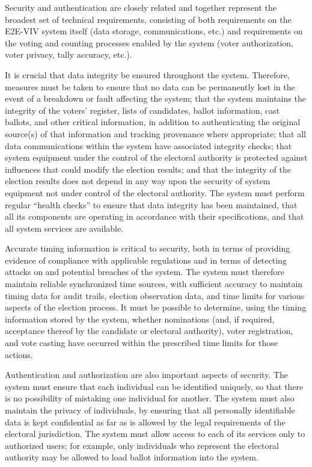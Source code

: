 Security and authentication are closely related and together represent
the broadest set of technical requirements, consisting of both
requirements on the E2E-VIV system itself (data storage,
communications, etc.) and requirements on the voting and counting
processes enabled by the system (voter authorization, voter privacy,
tally accuracy, etc.).

It is crucial that data integrity be ensured throughout the
system. Therefore, measures must be taken to ensure that no data can
be permanently lost in the event of a breakdown or fault affecting the
system; that the system maintains the integrity of the voters'
register, lists of candidates, ballot information, cast ballots, and
other critical information, in addition to authenticating the original
source(s) of that information and tracking provenance where
appropriate; that all data communications within the system have
associated integrity checks; that system equipment under the control
of the electoral authority is protected against influences that could
modify the election results; and that the integrity of the election
results does not depend in any way upon the security of system
equipment not under control of the electoral authority. The system
must perform regular ``health checks'' to ensure that data integrity
has been maintained, that all its components are operating in
accordance with their specifications, and that all system services are
available.

Accurate timing information is critical to security, both in terms of
providing evidence of compliance with applicable regulations and in
terms of detecting attacks on and potential breaches of the
system. The system must therefore maintain reliable synchronized time
sources, with sufficient accuracy to maintain timing data for audit
trails, election observation data, and time limits for various aspects
of the election process. It must be possible to determine, using the
timing information stored by the system, whether nominations (and, if
required, acceptance thereof by the candidate or electoral authority),
voter registration, and vote casting have occurred within the
prescribed time limits for those actions.

Authentication and authorization are also important aspects of
security. The system must ensure that each individual can be
identified uniquely, so that there is no possibility of mistaking one
individual for another. The system must also maintain the privacy of
individuals, by ensuring that all personally identifiable data is kept
confidential as far as is allowed by the legal requirements of the
electoral jurisdiction. The system must allow access to each of its
services only to authorized users; for example, only individuals who
represent the electoral authority may be allowed to load ballot
information into the system.

